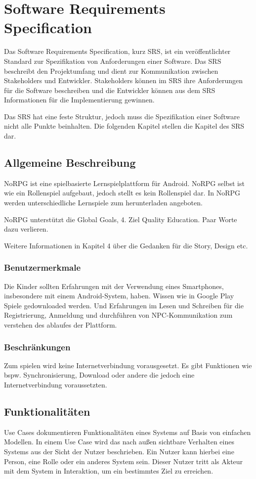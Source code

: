 \chapter{Software Requirements Specification}
	Das Software Requirements Specification, kurz SRS, ist ein veröffentlichter Standard zur Spezifikation von Anforderungen einer Software. Das SRS beschreibt den Projektumfang und dient zur Kommunikation zwischen Stakeholders und Entwickler. Stakeholders können im SRS ihre Anforderungen für die Software beschreiben und die Entwickler können aus dem SRS Informationen für die Implementierung gewinnen.
	
	Das SRS hat eine feste Struktur, jedoch muss die Spezifikation einer Software nicht alle Punkte beinhalten. Die folgenden Kapitel stellen die Kapitel des SRS dar.
	
\section{Allgemeine Beschreibung}
	NoRPG ist eine spielbasierte Lernspielplattform für Android. NoRPG selbst ist wie ein Rollenspiel aufgebaut, jedoch stellt es kein Rollenspiel dar. In NoRPG werden unterschiedliche Lernspiele zum herunterladen angeboten.
	
	NoRPG unterstützt die Global Goals, 4. Ziel Quality Education. Paar Worte dazu verlieren.		
	
	Weitere Informationen in Kapitel 4 über die Gedanken für die Story, Design etc.
	
	\subsection{Benutzermerkmale}
		Die Kinder sollten Erfahrungen mit der Verwendung eines Smartphones, insbesondere mit einem Android-System, haben. Wissen wie in Google Play Spiele gedownloaded werden. Und Erfahrungen im Lesen und Schreiben für die Registrierung, Anmeldung und durchführen von NPC-Kommunikation zum verstehen des ablaufes der Plattform.
	
	\subsection{Beschränkungen} 
		Zum spielen wird keine Internetverbindung vorausgesetzt. Es gibt Funktionen wie bspw. Synchronisierung, Download oder andere die jedoch eine Internetverbindung voraussetzten.  

\section{Funktionalitäten}
	Use Cases dokumentieren Funktionalitäten eines Systems auf Basis von einfachen Modellen. In einem Use Case wird das nach außen sichtbare Verhalten eines Systems aus der Sicht der Nutzer beschrieben. Ein Nutzer kann hierbei eine Person, eine Rolle oder ein anderes System sein. Dieser Nutzer tritt als Akteur mit dem System in Interaktion, um ein bestimmtes Ziel zu erreichen.
	
